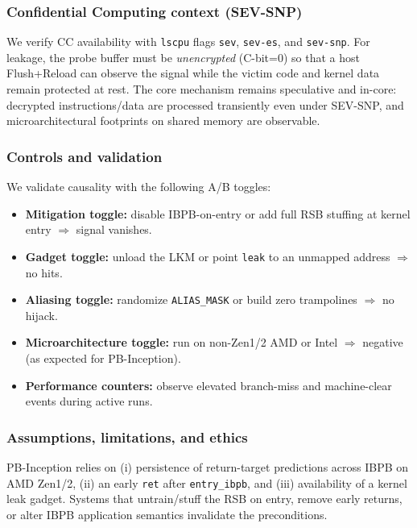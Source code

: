 \documentclass[11pt,a4paper]{article}
\begin{document}
\subsubsection{Confidential Computing context (SEV-SNP)}
\label{sec:method:pb-inception:cc}
We verify CC availability with \texttt{lscpu} flags \texttt{sev}, \texttt{sev-es}, and \texttt{sev-snp}. For leakage, the probe buffer must be \emph{unencrypted} (C-bit=0) so that a host Flush+Reload can observe the signal while the victim code and kernel data remain protected at rest. The core mechanism remains speculative and in-core: decrypted instructions/data are processed transiently even under SEV-SNP, and microarchitectural footprints on shared memory are observable.

\subsubsection{Controls and validation}
\label{sec:method:pb-inception:controls}
We validate causality with the following A/B toggles:
\begin{itemize}
  \item \textbf{Mitigation toggle:} disable IBPB-on-entry or add full RSB stuffing at kernel entry $\Rightarrow$ signal vanishes.
  \item \textbf{Gadget toggle:} unload the LKM or point \texttt{leak} to an unmapped address $\Rightarrow$ no hits.
  \item \textbf{Aliasing toggle:} randomize \texttt{ALIAS\_MASK} or build zero trampolines $\Rightarrow$ no hijack.
  \item \textbf{Microarchitecture toggle:} run on non-Zen1/2 AMD or Intel $\Rightarrow$ negative (as expected for PB-Inception).
  \item \textbf{Performance counters:} observe elevated branch-miss and machine-clear events during active runs.
\end{itemize}

\subsubsection{Assumptions, limitations, and ethics}
\label{sec:method:pb-inception:limits}
PB-Inception relies on (i) persistence of return-target predictions across IBPB on AMD Zen1/2, (ii) an early \texttt{ret} after \texttt{entry\_ibpb}, and (iii) availability of a kernel leak gadget. Systems that untrain/stuff the RSB on entry, remove early returns, or alter IBPB application semantics invalidate the preconditions.
\end{document}
